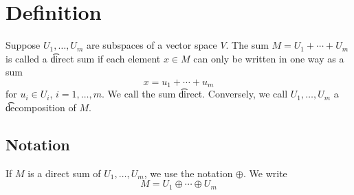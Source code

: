 
\section*{Definition}

Suppose $U_1, \dots , U_m$ are subspaces of a vector space $V$.
The sum $M = U_1 + \cdots + U_m$ is called a \t{direct sum} if each element $x \in M$ can only be written in one way as a sum
\[
x = u_1 + \cdots + u_m
\]
for $u_i \in U_i$, $i = 1, \dots , m$.
We call the sum \t{direct}.
Conversely, we call $U_1, \dots , U_m$ a \t{decomposition} of $M$.

\subsection*{Notation}

If $M$ is a direct sum of $U_1, \dots , U_m$, we use the notation $\oplus$.
We write
\[
M = U_1 \oplus \cdots \oplus U_m
\]

\blankpage